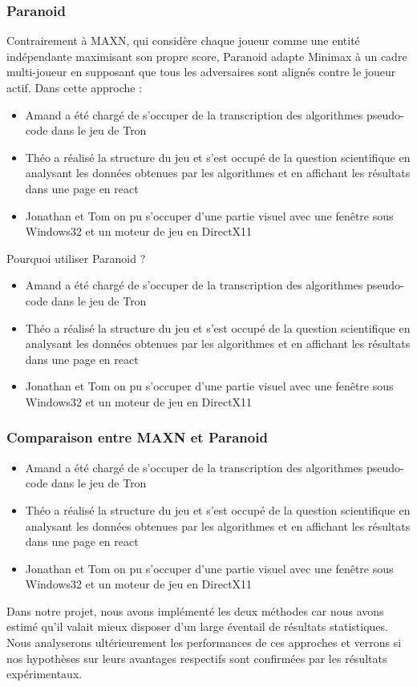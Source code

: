 \subsubsection{Paranoid}
Contrairement à MAXN, qui considère chaque joueur comme une entité indépendante maximisant son propre score, Paranoid adapte Minimax à un cadre multi-joueur en supposant que tous les adversaires sont alignés contre le joueur actif.
Dans cette approche :
\begin{itemize}
    \item Amand a été chargé de s'occuper de la transcription des algorithmes pseudo-code dans le jeu de Tron
    \item Théo a réalisé la structure du jeu et s'est occupé de la question scientifique en analysant les données obtenues par les algorithmes et en affichant les résultats dans une page en react
    \item Jonathan et Tom on pu s'occuper d'une partie visuel avec une fenêtre sous Windows32 et un moteur de jeu en DirectX11
\end{itemize}
Pourquoi utiliser Paranoid ?
\begin{itemize}
    \item Amand a été chargé de s'occuper de la transcription des algorithmes pseudo-code dans le jeu de Tron
    \item Théo a réalisé la structure du jeu et s'est occupé de la question scientifique en analysant les données obtenues par les algorithmes et en affichant les résultats dans une page en react
    \item Jonathan et Tom on pu s'occuper d'une partie visuel avec une fenêtre sous Windows32 et un moteur de jeu en DirectX11
\end{itemize}

\subsubsection{Comparaison entre MAXN et Paranoid}
\begin{itemize}
    \item Amand a été chargé de s'occuper de la transcription des algorithmes pseudo-code dans le jeu de Tron
    \item Théo a réalisé la structure du jeu et s'est occupé de la question scientifique en analysant les données obtenues par les algorithmes et en affichant les résultats dans une page en react
    \item Jonathan et Tom on pu s'occuper d'une partie visuel avec une fenêtre sous Windows32 et un moteur de jeu en DirectX11
\end{itemize}
Dans notre projet, nous avons implémenté les deux méthodes car nous avons estimé qu'il valait mieux disposer d'un large éventail de résultats statistiques. Nous analyserons ultérieurement les performances de ces approches et verrons si nos hypothèses sur leurs avantages respectifs sont confirmées par les résultats expérimentaux.

